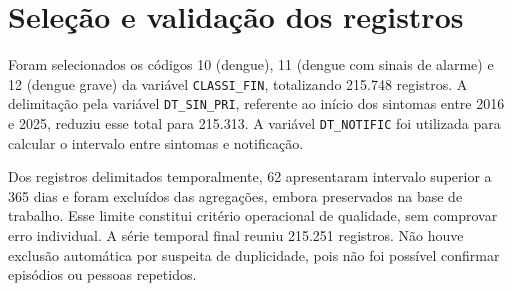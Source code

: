 \begin{figure}[!htbp]
    \centering
    \label{fig:fluxograma_metodologia}

    \begingroup
    \setlength{\fboxsep}{2pt}
    \footnotesize


    \endgroup

\end{figure}

\FloatBarrier

\section{Seleção e validação dos registros}
\label{sec:selecao_registros}

Foram selecionados os códigos 10 (dengue), 11 (dengue com sinais de alarme) e 12 (dengue grave) da variável \texttt{CLASSI\_FIN}, totalizando 215.748 registros. A delimitação pela variável \texttt{DT\_SIN\_PRI}, referente ao início dos sintomas entre 2016 e 2025, reduziu esse total para 215.313. A variável \texttt{DT\_NOTIFIC} foi utilizada para calcular o intervalo entre sintomas e notificação.

Dos registros delimitados temporalmente, 62 apresentaram intervalo superior a 365 dias e foram excluídos das agregações, embora preservados na base de trabalho. Esse limite constitui critério operacional de qualidade, sem comprovar erro individual. A série temporal final reuniu 215.251 registros. Não houve exclusão automática por suspeita de duplicidade, pois não foi possível confirmar episódios ou pessoas repetidos.

